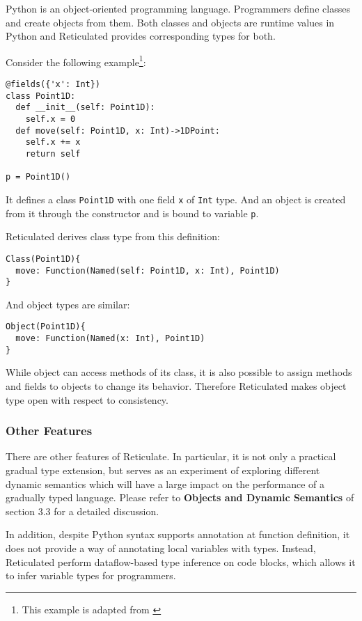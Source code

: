 Python is an object-oriented programming language.
Programmers define classes and create objects from them.
Both classes and objects are runtime values in Python
and Reticulated provides corresponding types for both.

Consider the following example\footnote{This example is adapted from \cite{vitousek2014design}}:

\begin{verbatim}
@fields({'x': Int})
class Point1D:
  def __init__(self: Point1D):
    self.x = 0
  def move(self: Point1D, x: Int)->1DPoint:
    self.x += x
    return self

p = Point1D()
\end{verbatim}

It defines a class \texttt{Point1D} with one field \texttt{x} of \texttt{Int} type.
And an object is created from it through the constructor
and is bound to variable \texttt{p}.

Reticulated derives class type from this definition:

\begin{verbatim}
Class(Point1D){
  move: Function(Named(self: Point1D, x: Int), Point1D)
}
\end{verbatim}

And object types are similar:

\begin{verbatim}
Object(Point1D){
  move: Function(Named(x: Int), Point1D)
}
\end{verbatim}

While object can access methods of its class, it is also possible
to assign methods and fields to objects to change its behavior.
Therefore Reticulated makes object type open with respect to consistency.

\subsubsection{Other Features}

There are other features of Reticulate.
In particular, it is not only a practical gradual type extension,
but serves as an experiment of exploring
different dynamic semantics which will have a large impact on
the performance of a gradually typed language.
Please refer to \textbf{Objects and Dynamic Semantics} of section
3.3 for a detailed discussion.

In addition, despite Python syntax supports annotation at function definition,
it does not provide a way of annotating local variables with types.
Instead, Reticulated perform dataflow-based type inference on code blocks, which allows it to infer variable types for programmers.

